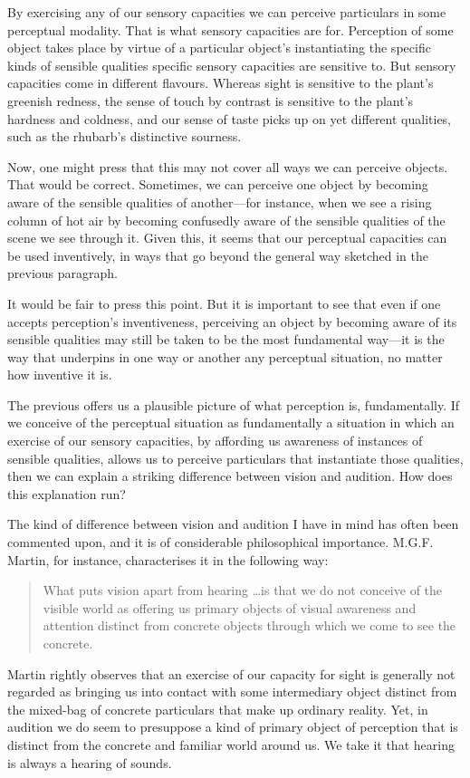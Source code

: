 \documentclass[sloppy, journal, bytitle, dodraft]{humapap}
\begin{document}
By exercising any of our sensory capacities we can perceive particulars in some perceptual modality. That is what sensory capacities are for. Perception of some object takes place by virtue of a particular object's instantiating the specific kinds of sensible qualities specific sensory capacities are sensitive to. But sensory capacities come in different flavours. Whereas sight is sensitive to the plant's greenish redness, the sense of touch by contrast is sensitive to the plant's hardness and coldness, and our sense of taste picks up on yet different qualities, such as the rhubarb's distinctive sourness. 

Now, one might press that this may not cover all ways we can perceive objects. That would be correct. Sometimes, we can perceive one object by becoming aware of the sensible qualities of another---for instance, when we see a rising column of hot air by becoming confusedly aware of the sensible qualities of the scene we see through it. Given this, it seems that our perceptual capacities can be used inventively, in ways that go beyond the general way sketched in the previous paragraph. 

It would be fair to press this point. But it is important to see that even if one accepts perception's inventiveness, perceiving an object by becoming aware of its sensible qualities may still be taken to be the most fundamental way---it is the way that underpins in one way or another any perceptual situation, no matter how inventive it is. 


\sect The previous offers us a plausible picture of what perception is, fundamentally. If we conceive of the perceptual situation as fundamentally a situation in which an exercise of our sensory capacities, by affording us awareness of instances of sensible qualities, allows us to perceive particulars that instantiate those qualities, then we can explain a striking difference between vision and audition. How does this explanation run?   

The kind of difference between vision and audition I have in mind has often been commented upon, and it is of considerable philosophical importance. M.G.F. Martin, for instance, characterises it in the following way: 

\begin{quote}
What puts vision apart from hearing \ldots is that we do not conceive of the visible world as offering us primary objects of visual awareness and attention distinct from concrete objects through which we come to see the concrete.\autocite[p. 334]{martin2012aa}
\end{quote}
Martin rightly observes that an exercise of our capacity for sight is generally not regarded as bringing us into contact with some intermediary object distinct from the mixed-bag of concrete particulars that make up ordinary reality. Yet, in audition we do seem to presuppose a kind of primary object of perception that is distinct from the concrete and familiar world around us. We take it that hearing is always a hearing of sounds. 
\end{document}

